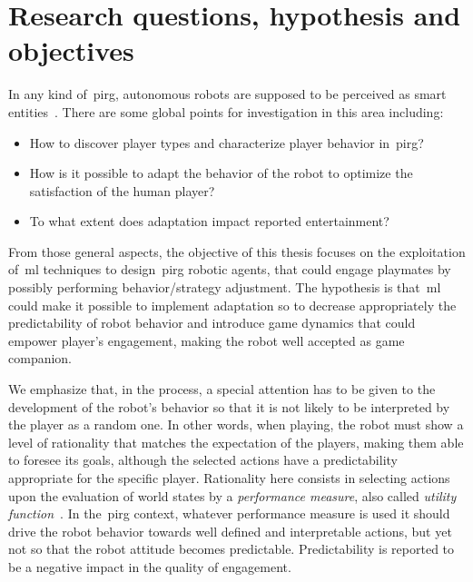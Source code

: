 \section{Research questions, hypothesis and objectives}\label{sec:research_question}
In any kind of~\gls{pirg}, autonomous robots are supposed to be perceived as smart entities~\citep{martinoia_physically_2013, bonarini_timing_2014}. There are some global points for investigation in this area including:

\begin{itemize}
\item How to discover player types and characterize player behavior in~\gls{pirg}? %
\item How is it possible to adapt the behavior of the robot to optimize the satisfaction of the human player?
\item To what extent does adaptation impact reported entertainment? %
\end{itemize}

From those general aspects, the objective of this thesis focuses on the exploitation of~\gls{ml} techniques to design~\gls{pirg} robotic agents, that could engage playmates by possibly performing behavior/strategy adjustment. The hypothesis is that~\gls{ml} could make it possible to implement adaptation so to decrease appropriately the predictability of robot behavior and introduce game dynamics that could empower player’s engagement, making the robot well accepted as game companion.

We emphasize that, in the process, a special attention has to be given to the development of the robot's behavior so that it is not likely to be interpreted by the player as a random one. In other words, when playing, the robot must show a level of rationality that matches the expectation of the players, making them able to foresee its goals, although the selected actions have a predictability appropriate for the specific player. Rationality here consists in selecting actions upon the evaluation of world states %
by a \textit{performance measure}, also called \textit{utility function}~\citep{russell_artificial_2009}. In the~\gls{pirg} context, whatever performance measure is used it should drive the robot behavior towards well defined and interpretable actions, but yet not so that the robot attitude becomes predictable. Predictability is reported to be a negative impact in the quality of engagement.   


